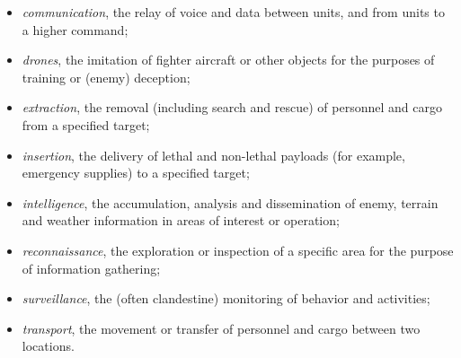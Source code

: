 \begin{itemize}

\item \emph{communication}, the relay of voice and data between units, and from units to a higher command;

\item \emph{drones}, the imitation of fighter aircraft or other objects for the purposes of training or (enemy) deception;

\item \emph{extraction}, the removal (including search and rescue) of personnel and cargo from a specified target;

\item \emph{insertion}, the delivery of lethal and non-lethal payloads (for example, emergency supplies) to a specified target;

\item \emph{intelligence}, the accumulation, analysis and dissemination of enemy, terrain and weather information in areas of interest or operation;

\item \emph{reconnaissance}, the exploration or inspection of a specific area for the purpose of information gathering;

\item \emph{surveillance}, the (often clandestine) monitoring of behavior and activities;

\item \emph{transport}, the movement or transfer of personnel and cargo between two locations.

\end{itemize}


